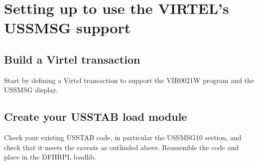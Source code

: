 \documentclass[letterpaper,10pt,english]{sphinxmanual}
\begin{document}
\section{Setting up to use the VIRTEL’s USSMSG support}
\label{\detokenize{Customization:setting-up-to-use-the-virtel-s-ussmsg-support}}

\subsection{Build a Virtel transaction}
\label{\detokenize{Customization:build-a-virtel-transaction}}
\sphinxAtStartPar
Start by defining a Virtel transaction to support the VIR0021W program and the USSMSG display.

\begin{sphinxVerbatim}[commandchars=\\\{\}]
                                              
                                                   
                                    
                                                  
                                                         
                                                 
                                                      
                                                     
\end{sphinxVerbatim}

\sphinxAtStartPar
{}

\sphinxAtStartPar
{}


\subsection{Create your USSTAB load module}
\label{\detokenize{Customization:create-your-usstab-load-module}}
\sphinxAtStartPar
Check your existing USSTAB code, in particular the USSMSG10 section, and check that it meets the caveats as outlinded above. Re\sphinxhyphen{}assemble the code and place in the DFHRPL loadlib.
\end{document}
